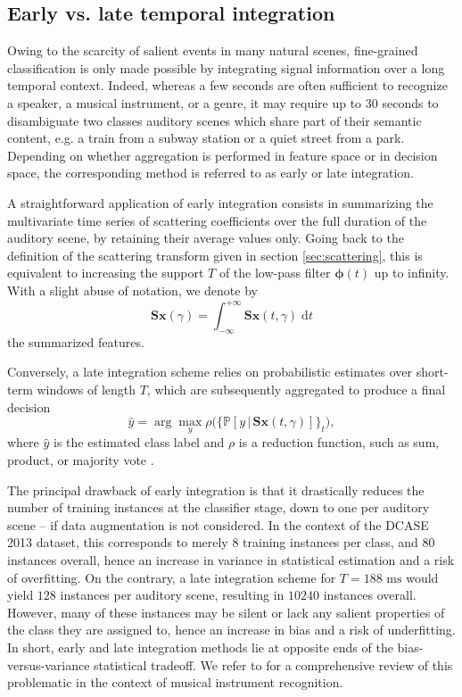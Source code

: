 \documentclass[journal]{IEEEtran}
\makeatletter
\newcommand*{\eg}{e.g.\@\xspace}
\newcommand*{\vs}{vs.\@\xspace}
\makeatother
\begin{document}
\subsection{Early \vs late temporal integration}
\label{sec:eili}

Owing to the scarcity of salient events in many natural scenes,
fine-grained classification is only made
possible by integrating signal information over a long temporal context.
Indeed, whereas a few seconds are often sufficient to recognize a speaker,
a musical instrument, or a genre, it may require up to 30 seconds
to disambiguate two classes auditory scenes which share part of their semantic content, \eg a train from a subway station or a quiet street from a park.
Depending on whether aggregation is performed in feature space or in decision space, the corresponding method is referred to as early or late integration.

A straightforward application of early integration consists in summarizing the multivariate time series of scattering coefficients over the full duration of the auditory scene, by retaining their average values only.
Going back to the definition of the scattering transform given in section \ref{sec:scattering}, this is equivalent to increasing the support $T$ of the low-pass filter $\boldsymbol{\phi}(t)$ up to infinity. With a slight abuse of notation, we denote by
\begin{equation}
\mathbf{S}\boldsymbol{x}(\gamma) =
\int_{-\infty}^{+\infty} \mathbf{S}\boldsymbol{x}(t,\gamma)\;\mathrm{d}t
\end{equation}
the summarized features.

Conversely, a late integration scheme relies on probabilistic estimates over short-term windows of length $T$, which are subsequently aggregated to produce a final decision
\begin{equation}
\hat{y} = \arg \max_{y} \rho\Big(\big\{ \mathbb{P}\left[y \,\vert\, \mathbf{S}\boldsymbol{x}(t,\gamma) \right] \big\}_{t} \Big),
\end{equation}
where $\hat{y}$ is the estimated class label and $\rho$ is a reduction function, such as sum, product, or majority vote \cite{Kittler1998}.

The principal drawback of early integration is that it drastically reduces the number of training instances at the classifier stage, down to one per auditory scene -- if data augmentation is not considered.
In the context of the DCASE 2013 dataset, this corresponds to merely $8$ training instances per class, and $80$ instances overall, hence an increase in variance in statistical estimation and a risk of overfitting.
On the contrary, a late integration scheme for $T=188\textrm{ ms}$ would yield $128$ instances per auditory scene, resulting in $10240$ instances overall.
However, many of these instances may be silent or lack any salient properties of the class they are assigned to, hence an increase in bias and a risk of underfitting.
In short, early and late integration methods lie at opposite ends of the bias-versus-variance statistical tradeoff. We refer to \cite{Joder2009} for a comprehensive review of this problematic in the context of musical instrument recognition.
\end{document}
